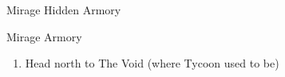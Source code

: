 \begin{paracol}{2}
\begin{shop}{Mirage Hidden Armory}
    \varwb
    \begin{buy}
        \item {} \runningShoes \space {}
    \end{buy}
    \varwe
\end{shop}

\begin{shop}{Mirage Armory}
    \varwb
    \begin{buy}
        \item {} \crystalShield \space {}
    \end{buy}
    \varwe
\end{shop}

\begin{enumerate}[resume]
    \item Head north to The Void (where Tycoon used to be)
\end{enumerate}
    
\end{paracol}